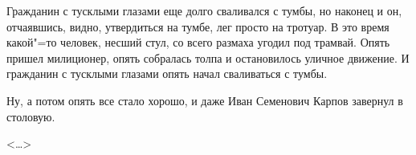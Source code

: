 \documentclass{article}
\begin{document}
Гражданин с тусклыми глазами еще долго сваливался с тумбы, но наконец и он,
отчаявшись, видно, утвердиться на тумбе, лег просто на тротуар. В это время
какой"=то человек, несший стул, со всего размаха угодил под трамвай. Опять
пришел милиционер, опять собралась толпа и остановилось уличное движение. И
гражданин с тусклыми глазами опять начал сваливаться с тумбы.

Ну, а потом опять все стало хорошо, и даже Иван Семенович Карпов завернул в
столовую.

\begin{flushright}<\dots>\end{flushright}
\end{document}
